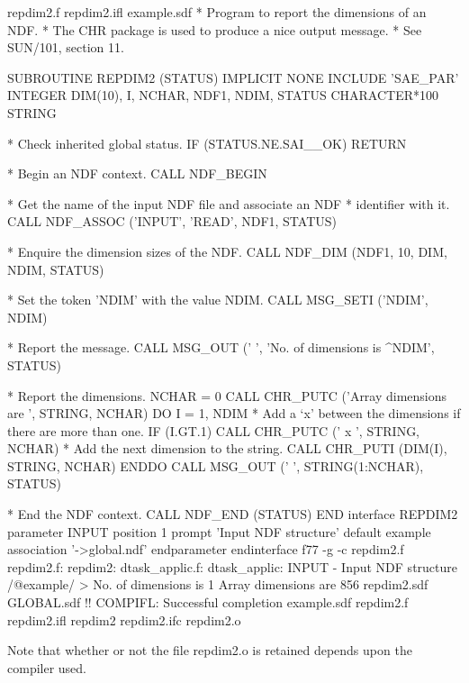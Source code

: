 \documentclass[twoside,11pt,nolof]{starlink}
\begin{document}
\begin{terminalv}
%
repdim2.f       repdim2.ifl     example.sdf
%
*   Program to report the dimensions of an NDF.
*   The CHR package is used to produce a nice output message.
*   See SUN/101, section 11.

      SUBROUTINE REPDIM2 (STATUS)
      IMPLICIT NONE
      INCLUDE 'SAE_PAR'
      INTEGER DIM(10), I, NCHAR, NDF1, NDIM, STATUS
      CHARACTER*100 STRING

*   Check inherited global status.
      IF (STATUS.NE.SAI__OK) RETURN

*   Begin an NDF context.
      CALL NDF_BEGIN

*   Get the name of the input NDF file and associate an NDF
*   identifier with it.
      CALL NDF_ASSOC ('INPUT', 'READ', NDF1, STATUS)

*   Enquire the dimension sizes of the NDF.
      CALL NDF_DIM (NDF1, 10, DIM, NDIM, STATUS)

*   Set the token 'NDIM' with the value NDIM.
      CALL MSG_SETI ('NDIM', NDIM)

*   Report the message.
      CALL MSG_OUT (' ', 'No. of dimensions is ^NDIM', STATUS)

*   Report the dimensions.
      NCHAR = 0
      CALL CHR_PUTC ('Array dimensions are ', STRING, NCHAR)
      DO  I = 1, NDIM
*      Add a `x' between the dimensions if there are more than one.
         IF (I.GT.1) CALL CHR_PUTC (' x ', STRING, NCHAR)
*      Add the next dimension to the string.
         CALL CHR_PUTI (DIM(I), STRING, NCHAR)
      ENDDO
      CALL MSG_OUT ('  ', STRING(1:NCHAR), STATUS)

*   End the NDF context.
      CALL NDF_END (STATUS)
      END
%
interface REPDIM2
   parameter      INPUT
      position    1
      prompt      'Input NDF structure'
      default     example
      association '->global.ndf'
   endparameter
endinterface
%
f77 -g -c repdim2.f
repdim2.f:
        repdim2:
dtask_applic.f:
        dtask_applic:
%
INPUT - Input NDF structure /@example/ >
No. of dimensions is 1
Array dimensions are 856
%
repdim2.sdf     GLOBAL.sdf
%
!! COMPIFL: Successful completion
%
example.sdf   repdim2.f     repdim2.ifl
repdim2       repdim2.ifc   repdim2.o
%
\end{terminalv}
Note that whether or not the file repdim2.o is retained depends upon the
compiler used.
\end{document}
